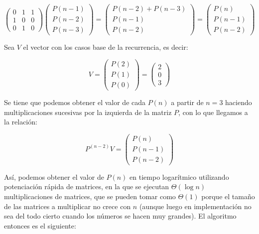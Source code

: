 \documentclass[letterpaper, 12pt]{article}
\begin{document}
\begin{enumerate}
\begin{equation*}
\begin{pmatrix}
        0 & 1 & 1 \\
        1 & 0 & 0 \\
        0 & 1 & 0
\end{pmatrix}
\begin{pmatrix}
        P(n - 1) \\
        P(n - 2) \\
        P(n - 3)
\end{pmatrix}
=
\begin{pmatrix}
        P(n - 2) + P(n - 3) \\
        P(n - 1) \\
        P(n - 2)
\end{pmatrix}
=
\begin{pmatrix}
        P(n) \\
        P(n - 1) \\
        P(n - 2)
\end{pmatrix}
\end{equation*}

\newpage
Sea $V$ el vector con los casos base de la recurrencia, es decir:

\begin{equation*}
    V =
\begin{pmatrix}
        P(2) \\
        P(1) \\
        P(0)
\end{pmatrix}
=
\begin{pmatrix}
        2 \\
        0 \\
        3
\end{pmatrix}
\end{equation*}

Se tiene que podemos obtener el valor de cada $P(n)$ a partir de $n=3$ haciendo multiplicaciones sucesivas por la izquierda de la matriz $P$, con lo que llegamos a la relación:

\begin{equation*}
    {P}^{(n-2)}V =
\begin{pmatrix}
    P(n) \\
    P(n-1) \\
    P(n-2)
\end{pmatrix}
\end{equation*}

Así, podemos obtener el valor de $P(n)$ en tiempo logarítmico utilizando potenciación rápida de matrices, en la que se ejecutan $\Theta(\log n)$ multiplicaciones de matrices, que se pueden tomar como $\Theta(1)$ porque el tamaño de las matrices a multiplicar no crece con $n$ (aunque luego en implementación no sea del todo cierto cuando los números se hacen muy grandes). El algoritmo entonces es el siguiente:


\end{enumerate}
\end{document}
